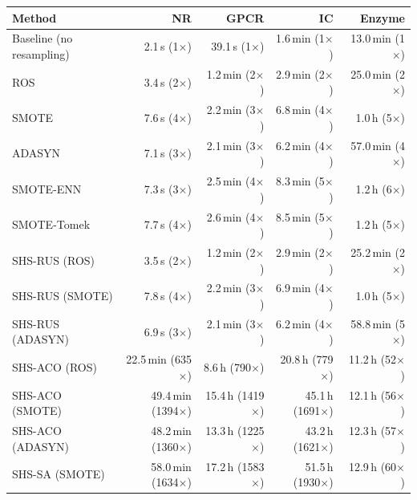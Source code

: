 \begin{tabular}{lrrrr}
\toprule
Method & NR & GPCR & IC & Enzyme \\
\midrule
Baseline (no resampling) & 2.1\,s (1$\times$) & 39.1\,s (1$\times$) & 1.6\,min (1$\times$) & 13.0\,min (1$\times$) \\
ROS & 3.4\,s (2$\times$) & 1.2\,min (2$\times$) & 2.9\,min (2$\times$) & 25.0\,min (2$\times$) \\
SMOTE & 7.6\,s (4$\times$) & 2.2\,min (3$\times$) & 6.8\,min (4$\times$) & 1.0\,h (5$\times$) \\
ADASYN & 7.1\,s (3$\times$) & 2.1\,min (3$\times$) & 6.2\,min (4$\times$) & 57.0\,min (4$\times$) \\
SMOTE-ENN & 7.3\,s (3$\times$) & 2.5\,min (4$\times$) & 8.3\,min (5$\times$) & 1.2\,h (6$\times$) \\
SMOTE-Tomek & 7.7\,s (4$\times$) & 2.6\,min (4$\times$) & 8.5\,min (5$\times$) & 1.2\,h (5$\times$) \\
SHS-RUS (ROS) & 3.5\,s (2$\times$) & 1.2\,min (2$\times$) & 2.9\,min (2$\times$) & 25.2\,min (2$\times$) \\
SHS-RUS (SMOTE) & 7.8\,s (4$\times$) & 2.2\,min (3$\times$) & 6.9\,min (4$\times$) & 1.0\,h (5$\times$) \\
SHS-RUS (ADASYN) & 6.9\,s (3$\times$) & 2.1\,min (3$\times$) & 6.2\,min (4$\times$) & 58.8\,min (5$\times$) \\
SHS-ACO (ROS) & 22.5\,min (635$\times$) & 8.6\,h (790$\times$) & 20.8\,h (779$\times$) & 11.2\,h (52$\times$) \\
SHS-ACO (SMOTE) & 49.4\,min (1394$\times$) & 15.4\,h (1419$\times$) & 45.1\,h (1691$\times$) & 12.1\,h (56$\times$) \\
SHS-ACO (ADASYN) & 48.2\,min (1360$\times$) & 13.3\,h (1225$\times$) & 43.2\,h (1621$\times$) & 12.3\,h (57$\times$) \\
SHS-SA (SMOTE) & 58.0\,min (1634$\times$) & 17.2\,h (1583$\times$) & 51.5\,h (1930$\times$) & 12.9\,h (60$\times$) \\
\bottomrule
\end{tabular}
